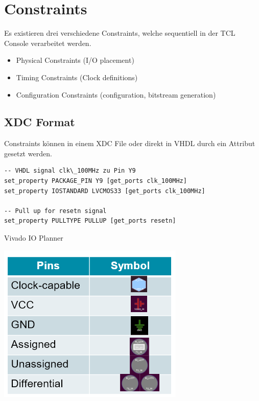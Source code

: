 \section{Constraints}
Es existieren drei verschiedene Constraints, welche sequentiell in der TCL Console verarbeitet werden.
\begin{itemize}[nosep]
	\item Physical Constraints (I/O placement)
	\item Timing Constraints (Clock definitions)
	\item Configuration Constraints (configuration, bitstream generation)
\end{itemize}

\subsection{XDC Format}
Constraints können in einem XDC File oder direkt in VHDL durch ein Attribut gesetzt werden.
\begin{lstlisting}
-- VHDL signal clk\_100MHz zu Pin Y9
set_property PACKAGE_PIN Y9 [get_ports clk_100MHz]
set_property IOSTANDARD LVCMOS33 [get_ports clk_100MHz]

-- Pull up for resetn signal
set_property PULLTYPE PULLUP [get_ports resetn]
\end{lstlisting}

Vivado IO Planner
\begin{center}
	\includegraphics[width=0.4\columnwidth]{Images/ioplanner}
\end{center}

